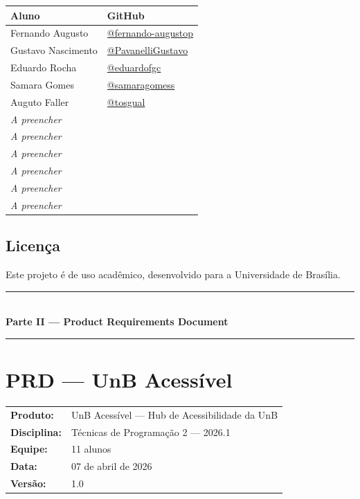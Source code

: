 \documentclass[12pt, a4paper]{article}
\newcommand{\partseparator}[1]{
  \clearpage
  \thispagestyle{empty}
  \vspace*{\fill}
  \begin{center}
    {\color{unbgreen}\rule{0.4\textwidth}{1pt}}\\[1.5em]
    {\Huge\bfseries\color{unbdark}#1}\\[1.5em]
    {\color{unbgreen}\rule{0.4\textwidth}{1pt}}
  \end{center}
  \vspace*{\fill}
  \clearpage
}
\begin{document}
\begin{center}
\begin{tabularx}{\textwidth}{X X}
  \toprule
  \rowcolor{unbgreen!10}
  \textbf{Aluno} & \textbf{GitHub} \\
  \midrule
  Fernando Augusto & \href{https://github.com/fernando-augustop}{@fernando-augustop} \\
  Gustavo Nascimento & \href{https://github.com/PavanelliGustavo}{@PavanelliGustavo} \\
  Eduardo Rocha & \href{https://github.com/eduardofgc}{@eduardofgc} \\
  Samara Gomes & \href{https://github.com/samaragomess}{@samaragomess} \\
  Auguto Faller & \href{https://github.com/tosgual}{@tosgual} \\
  \emph{A preencher} & \\
  \emph{A preencher} & \\
  \emph{A preencher} & \\
  \emph{A preencher} & \\
  \emph{A preencher} & \\
  \emph{A preencher} & \\
  \bottomrule
\end{tabularx}
\end{center}

\subsection{Licença}

Este projeto é de uso acadêmico, desenvolvido para a Universidade de Brasília.


\partseparator{Parte II — Product Requirements Document}

\section{PRD — UnB Acessível}

\begin{tabularx}{\textwidth}{>{\bfseries}l X}
  Produto: & UnB Acessível — Hub de Acessibilidade da UnB \\
  Disciplina: & Técnicas de Programação 2 — 2026.1 \\
  Equipe: & 11 alunos \\
  Data: & 07 de abril de 2026 \\
  Versão: & 1.0 \\
\end{tabularx}
\end{document}
